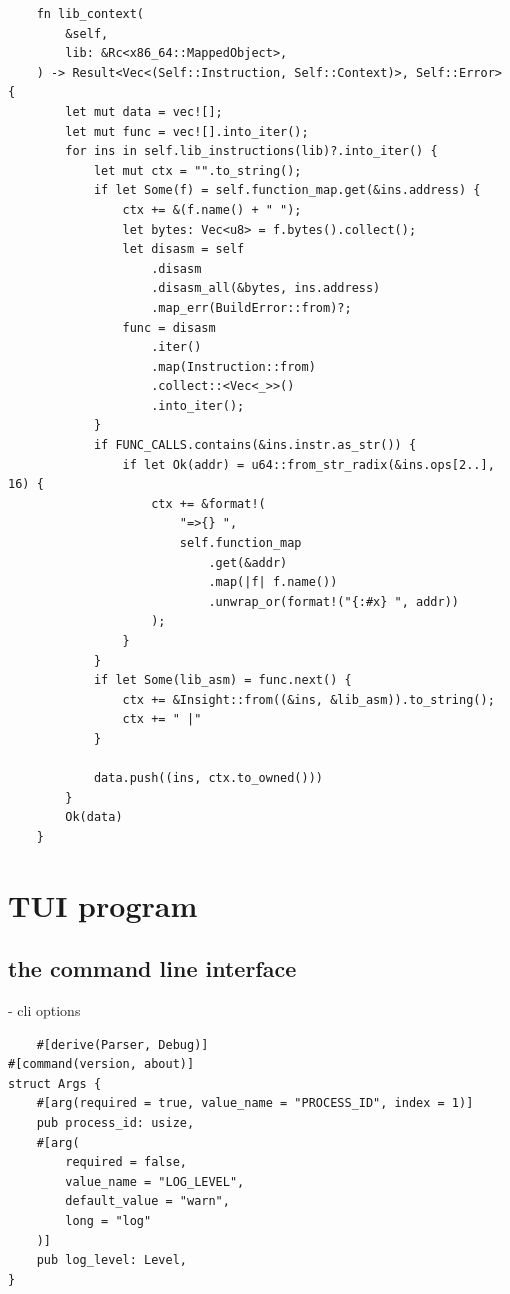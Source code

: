 \begin{lstlisting}
    fn lib_context(
        &self,
        lib: &Rc<x86_64::MappedObject>,
    ) -> Result<Vec<(Self::Instruction, Self::Context)>, Self::Error> {
        let mut data = vec![];
        let mut func = vec![].into_iter();
        for ins in self.lib_instructions(lib)?.into_iter() {
            let mut ctx = "".to_string();
            if let Some(f) = self.function_map.get(&ins.address) {
                ctx += &(f.name() + " ");
                let bytes: Vec<u8> = f.bytes().collect();
                let disasm = self
                    .disasm
                    .disasm_all(&bytes, ins.address)
                    .map_err(BuildError::from)?;
                func = disasm
                    .iter()
                    .map(Instruction::from)
                    .collect::<Vec<_>>()
                    .into_iter();
            }
            if FUNC_CALLS.contains(&ins.instr.as_str()) {
                if let Ok(addr) = u64::from_str_radix(&ins.ops[2..], 16) {
                    ctx += &format!(
                        "=>{} ",
                        self.function_map
                            .get(&addr)
                            .map(|f| f.name())
                            .unwrap_or(format!("{:#x} ", addr))
                    );
                }
            }
            if let Some(lib_asm) = func.next() {
                ctx += &Insight::from((&ins, &lib_asm)).to_string();
                ctx += " |"
            }

            data.push((ins, ctx.to_owned()))
        }
        Ok(data)
    }
\end{lstlisting}

\section{TUI program}

\subsection{the command line interface}

    - cli options

\begin{lstlisting}
    #[derive(Parser, Debug)]
#[command(version, about)]
struct Args {
    #[arg(required = true, value_name = "PROCESS_ID", index = 1)]
    pub process_id: usize,
    #[arg(
        required = false,
        value_name = "LOG_LEVEL",
        default_value = "warn",
        long = "log"
    )]
    pub log_level: Level,
}
\end{lstlisting}
    
